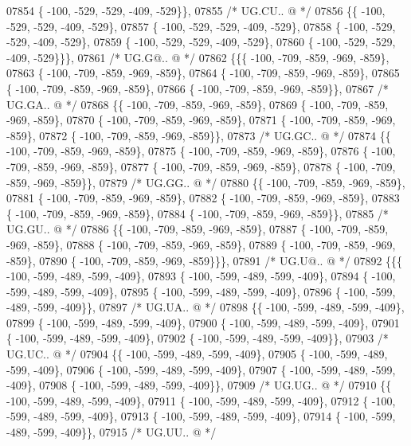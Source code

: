 \begin{DoxyCode}
07854 \{ -100, -529, -529, -409, -529\}\},
07855 \textcolor{comment}{/* UG.CU.. @ */}
07856 \{\{ -100, -529, -529, -409, -529\},
07857 \{ -100, -529, -529, -409, -529\},
07858 \{ -100, -529, -529, -409, -529\},
07859 \{ -100, -529, -529, -409, -529\},
07860 \{ -100, -529, -529, -409, -529\}\}\},
07861 \textcolor{comment}{/* UG.G@.. @ */}
07862 \{\{\{ -100, -709, -859, -969, -859\},
07863 \{ -100, -709, -859, -969, -859\},
07864 \{ -100, -709, -859, -969, -859\},
07865 \{ -100, -709, -859, -969, -859\},
07866 \{ -100, -709, -859, -969, -859\}\},
07867 \textcolor{comment}{/* UG.GA.. @ */}
07868 \{\{ -100, -709, -859, -969, -859\},
07869 \{ -100, -709, -859, -969, -859\},
07870 \{ -100, -709, -859, -969, -859\},
07871 \{ -100, -709, -859, -969, -859\},
07872 \{ -100, -709, -859, -969, -859\}\},
07873 \textcolor{comment}{/* UG.GC.. @ */}
07874 \{\{ -100, -709, -859, -969, -859\},
07875 \{ -100, -709, -859, -969, -859\},
07876 \{ -100, -709, -859, -969, -859\},
07877 \{ -100, -709, -859, -969, -859\},
07878 \{ -100, -709, -859, -969, -859\}\},
07879 \textcolor{comment}{/* UG.GG.. @ */}
07880 \{\{ -100, -709, -859, -969, -859\},
07881 \{ -100, -709, -859, -969, -859\},
07882 \{ -100, -709, -859, -969, -859\},
07883 \{ -100, -709, -859, -969, -859\},
07884 \{ -100, -709, -859, -969, -859\}\},
07885 \textcolor{comment}{/* UG.GU.. @ */}
07886 \{\{ -100, -709, -859, -969, -859\},
07887 \{ -100, -709, -859, -969, -859\},
07888 \{ -100, -709, -859, -969, -859\},
07889 \{ -100, -709, -859, -969, -859\},
07890 \{ -100, -709, -859, -969, -859\}\}\},
07891 \textcolor{comment}{/* UG.U@.. @ */}
07892 \{\{\{ -100, -599, -489, -599, -409\},
07893 \{ -100, -599, -489, -599, -409\},
07894 \{ -100, -599, -489, -599, -409\},
07895 \{ -100, -599, -489, -599, -409\},
07896 \{ -100, -599, -489, -599, -409\}\},
07897 \textcolor{comment}{/* UG.UA.. @ */}
07898 \{\{ -100, -599, -489, -599, -409\},
07899 \{ -100, -599, -489, -599, -409\},
07900 \{ -100, -599, -489, -599, -409\},
07901 \{ -100, -599, -489, -599, -409\},
07902 \{ -100, -599, -489, -599, -409\}\},
07903 \textcolor{comment}{/* UG.UC.. @ */}
07904 \{\{ -100, -599, -489, -599, -409\},
07905 \{ -100, -599, -489, -599, -409\},
07906 \{ -100, -599, -489, -599, -409\},
07907 \{ -100, -599, -489, -599, -409\},
07908 \{ -100, -599, -489, -599, -409\}\},
07909 \textcolor{comment}{/* UG.UG.. @ */}
07910 \{\{ -100, -599, -489, -599, -409\},
07911 \{ -100, -599, -489, -599, -409\},
07912 \{ -100, -599, -489, -599, -409\},
07913 \{ -100, -599, -489, -599, -409\},
07914 \{ -100, -599, -489, -599, -409\}\},
07915 \textcolor{comment}{/* UG.UU.. @ */}

\end{DoxyCode}
